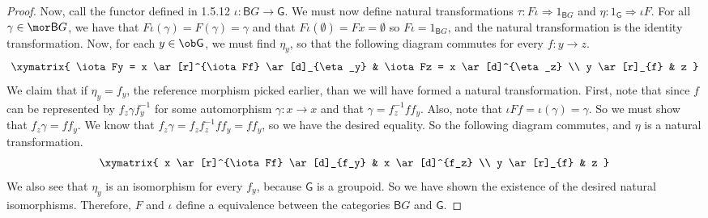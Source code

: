 \documentclass[../../main]{subfiles}
\begin{document}
\begin{proof}
	Now, call the functor defined in 1.5.12  $\iota\colon \textsf{B}G \rightarrow
	\textsf{G}$. We must now define natural transformations $\tau\colon F\iota
	\Rightarrow 1_{\textsf{B}G} $ and $\eta\colon 1_{\textsf{G}}\Rightarrow \iota F$.
	For all $\gamma \in\mor\textsf{B}G$, we have that $F\iota(\gamma) =
	F(\gamma) = \gamma$ and that $F\iota(\emptyset) = Fx = \emptyset$ so $F\iota
	= 1_{\textsf{B}G}$, and the natural transformation is the identity
	transformation. Now, for each $y \in\ob\textsf{G}$, we must find $\eta_y$,
	so that the following diagram commutes for every $f\colon y \rightarrow z$.
	\[\xymatrix{
			\iota Fy = x
			\ar[r]^{\iota Ff}
			\ar[d]_{\eta_y}
			& \iota Fz = x
			\ar[d]^{\eta_z}
			\\
			y
			\ar[r]_{f}
			& z
	}\]
	We claim that if $\eta_y = f_y$, the reference morphism picked earlier, than
	we will have formed a natural transformation. First, note that since $f$ can
	be represented by $f_z\gamma f_y^{-1}$ for some automorphism $\gamma\colon x
	\rightarrow x$ and that $\gamma = f_z^{-1}ff_y$. Also, note that $\iota Ff =
	\iota(\gamma) = \gamma$. So we must show that $f_z\gamma = ff_y$. We know
	that $f_z\gamma = f_zf_z^{-1}ff_y = ff_y$, so we have the desired equality.
	So the following diagram commutes, and $\eta$ is a natural transformation.
	\begin{align}
		\xymatrix{
			x
			\ar[r]^{\iota Ff}
			\ar[d]_{f_y}
			&  x
			\ar[d]^{f_z}
			\\
			y
			\ar[r]_{f}
			& z
		}
	\end{align}
	We also see that $\eta_y$ is an isomorphism for every $f_y$, because
	$\textsf{G}$ is a groupoid. So we have shown the existence of the desired
	natural isomorphisms. Therefore, $F$ and $\iota$ define a equivalence
	between  the categories $\textsf{B}G$ and $\textsf{G}$.
\end{proof}
\end{document}
